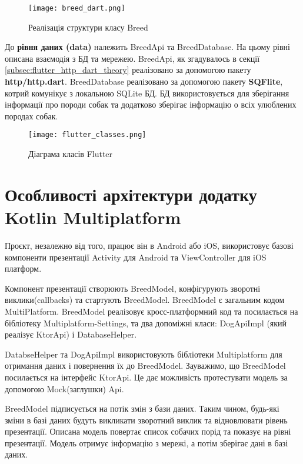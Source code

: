 \begin{figure}
    \begin{center}
        \texttt{[image: breed\_dart.png]}
        \caption{Реалізація структури класу Breed}
        \label{fig:flutter_breed_class}
    \end{center}
\end{figure}


До \textbf{рівня даних (data)} належить BreedApi та BreedDatabase. На цьому рівні описана взаємодія з БД та мережею.
BreedApi, як згадувалось в секції \ref{subsec:flutter_http_dart_theory} реалізовано за допомогою пакету \textbf{http/http.dart}.
BreedDatabase реалізовано за допомогою пакету \textbf{SQFlite}, котрий комунікує з локальною SQLite БД. БД використовується
для зберігання інформації про породи собак та додатково зберігає інформацію о всіх улюблених породах собак.

\begin{figure}
    \begin{center}
        \texttt{[image: flutter\_classes.png]}
        \caption{Діаграма класів Flutter}
        \label{fig:flutter_classes}
    \end{center}
\end{figure}


\section{Особливості архітектури додатку Kotlin Multiplatform}
\label{sec:kmm_architecture}

Проєкт, незалежно від того, працює він в Android або iOS, використовує базові компоненти презентації
Activity для Android та ViewController для iOS платформ.

Компонент презентації створюють BreedModel, конфігурують зворотні виклики(callbacks) та стартують BreedModel.
BreedModel є загальним кодом MultiPlatform.
BreedModel реалізовує кросс-платформний код та посилається на бібліотеку Multiplatform-Settings,
та два допоміжні класи: DogApiImpl (який реалізує KtorApi) і DatabaseHelper.

DatabseHelper та DogApiImpl використовують бібліотеки Multiplatform для отримання даних і повернення їх до BreedModel.
Зауважимо, що BreedModel посилається на інтерфейс KtorApi. Це дає можливість протестувати модель за допомогою Mock(заглушки) Api.

BreedModel підписується на потік змін з бази даних. Таким чином, будь-які зміни в базі даних будуть викликати
зворотний виклик та відновлювати рівень презентації.
Описана модель повертає список собачих порід та показує на рівні презентації.
Модель отримує інформацію з мережі, а потім зберігає дані в базі даних.

